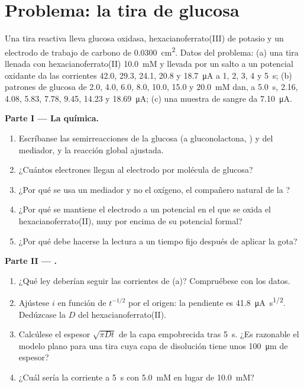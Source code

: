 \section{Problema: la tira de glucosa}

\begin{problem}
\label{pb:b3:electrode-kinetics:1}
Una tira reactiva lleva glucosa oxidasa, hexacianoferrato(III) de potasio y un
electrodo de trabajo de carbono de \qty{0.0300}{cm^2}. Datos del problema: (a) una tira
llenada con hexacianoferrato(II) \qty{10.0}{mM} y llevada por un salto a un potencial oxidante
da las corrientes 42.0, 29.3, 24.1, 20.8 y \qty{18.7}{\micro A} a 1, 2, 3, 4 y \qty{5}{s};
(b) patrones de glucosa de 2.0, 4.0, 6.0, 8.0, 10.0, 15.0 y \qty{20.0}{mM} dan, a
\qty{5.0}{s}, 2.16, 4.08, 5.83, 7.78, 9.45, 14.23 y \qty{18.69}{\micro A}; (c) una muestra de sangre da
\qty{7.10}{\micro A}.

\medskip\noindent\textbf{Parte I --- La química.}
\begin{enumerate}
  \item Escríbanse las semirreacciones de la glucosa (a gluconolactona, ) y del
        mediador, y la reacción global ajustada.
  \item ¿Cuántos electrones llegan al electrodo por molécula de glucosa?
  \item ¿Por qué se usa un mediador y no el oxígeno, el compañero natural de
        la ?
  \item ¿Por qué se mantiene el electrodo a un potencial en el que se oxida el hexacianoferrato(II),
        muy por encima de su potencial formal?
  \item ¿Por qué debe hacerse la lectura a un tiempo fijo después de aplicar
        la gota?
\end{enumerate}

\medskip\noindent\textbf{Parte II --- .}
\begin{enumerate}[resume]
  \item ¿Qué ley deberían seguir las corrientes de (a)? Compruébese con los datos.
  \item Ajústese $i$ en función de $t^{-1/2}$ por el origen: la pendiente es \qty{41.8}{\micro A.s^{1/2}}. Dedúzcase
        la $D$ del hexacianoferrato(II).
  \item Calcúlese el espesor $\sqrt{\pi Dt}$ de la capa empobrecida tras \qty{5}{s}. ¿Es
        razonable el modelo plano para una tira cuya capa de disolución tiene unos
        \qty{100}{\micro m} de espesor?
  \item ¿Cuál sería la corriente a \qty{5}{s} con \qty{5.0}{mM} en lugar de \qty{10.0}{mM}?
\end{enumerate}


\end{problem}
